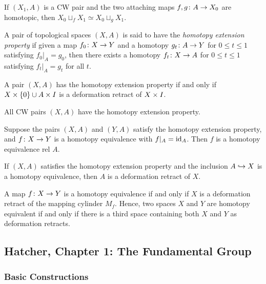 \begin{proposition}
  If $(X_1,A)$ is a CW pair and the two attaching maps $f,g \colon A \rightarrow X_0$ are homotopic, then $X_0 \sqcup_f X_1 \simeq X_0 \sqcup_g X_1$.
\end{proposition}

A pair of topological spaces $(X,A)$ is said to have the \emph{homotopy extension property} if given a map $f_0 \colon X \rightarrow Y$ and a homotopy $g_t \colon A \rightarrow Y$ for $0 \leq t \leq 1$ satisfying $f_0|_A = g_0$, then there exists a homotopy $f_t \colon X \rightarrow A$ for $0 \leq t \leq 1$ satisfying $f_t|_A = g_t$ for all $t$.

\begin{proposition}
  A pair $(X,A)$ has the homotopy extension property if and only if $X \times \{0\} \cup A \times I$ is a deformation retract of $X \times I$.
\end{proposition}

\begin{proposition}
  All CW pairs $(X,A)$ have the homotopy extension property.
\end{proposition}

\begin{proposition}
  Suppose the pairs $(X,A)$ and $(Y,A)$ satisfy the homotopy extension property, and $f \colon X \rightarrow Y$ is a homotopy equivalence with $f|_A = \operatorname{id}_A$. Then $f$ is a homotopy equivalence rel $A$.
\end{proposition}

\begin{corollary}
  If $(X,A)$ satisfies the homotopy extension property and the inclusion $A \hookrightarrow X$ is a homotopy equivalence, then $A$ is a deformation retract of $X$.
\end{corollary}

\begin{corollary}
  A map $f \colon X \rightarrow Y$ is a homotopy equivalence if and only if $X$ is a deformation retract of the mapping cylinder $M_f$. Hence, two spaces $X$ and $Y$ are homotopy equivalent if and only if there is a third space containing both $X$ and $Y$ as deformation retracts.
\end{corollary}

\subsection{Hatcher, Chapter 1: The Fundamental Group}

\subsubsection{Basic Constructions}

